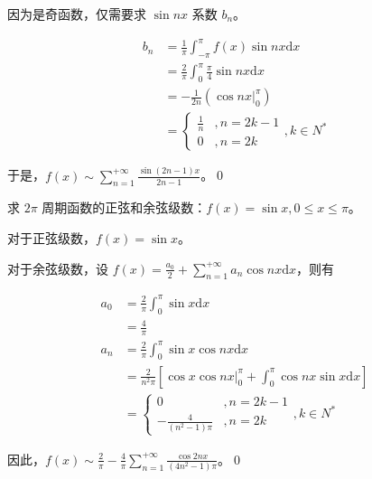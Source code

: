因为是奇函数，仅需要求 $\displaystyle \sin nx$ 系数 $\displaystyle b_{n}$。


\begin{align*}
	b_{n} & =\frac{1}{\pi }\int _{-\pi }^{\pi } f( x)\sin nx\mathrm{d} x\\
	& =\frac{2}{\pi }\int _{0}^{\pi }\frac{\pi }{4}\sin nx\mathrm{d} x\\
	& =-\frac{1}{2n}(\cos nx | _{0}^{\pi })\\
	& =\begin{cases}
		\frac{1}{n} & ,n=2k-1\\
		0 & ,n=2k
	\end{cases} ,k\in N^{*}
\end{align*}

于是，$\displaystyle f( x) \sim \sum _{n=1}^{+\infty }\frac{\sin( 2n-1) x}{2n-1}$。\qed 





\begin{ques}
	求 $\displaystyle 2\pi $ 周期函数的正弦和余弦级数：$\displaystyle f( x) =\sin x,0\leqslant x\leqslant \pi $。
\end{ques}





对于正弦级数，$\displaystyle f( x) =\sin x$。

对于余弦级数，设 $\displaystyle f( x) =\frac{a_{0}}{2} +\sum _{n=1}^{+\infty } a_{n}\cos nx\mathrm{d} x$，则有


\begin{align*}
	a_{0} & =\frac{2}{\pi }\int _{0}^{\pi }\sin x\mathrm{d} x\\
	& =\frac{4}{\pi }\\
	a_{n} & =\frac{2}{\pi }\int _{0}^{\pi }\sin x\cos nx\mathrm{d} x\\
	& =\frac{2}{n^{2} \pi }\left[\cos x\cos nx | _{0}^{\pi } +\int _{0}^{\pi }\cos nx\sin x\mathrm{d} x\right]\\
	& =\begin{cases}
		0 & ,n=2k-1\\
		-\frac{4}{\left( n^{2} -1\right) \pi } & ,n=2k
	\end{cases} ,k\in N^{*}
\end{align*}

因此，$\displaystyle f( x) \sim \frac{2}{\pi } -\frac{4}{\pi }\sum _{n=1}^{+\infty }\frac{\cos 2nx}{\left( 4n^{2} -1\right) \pi }$。\qed 







